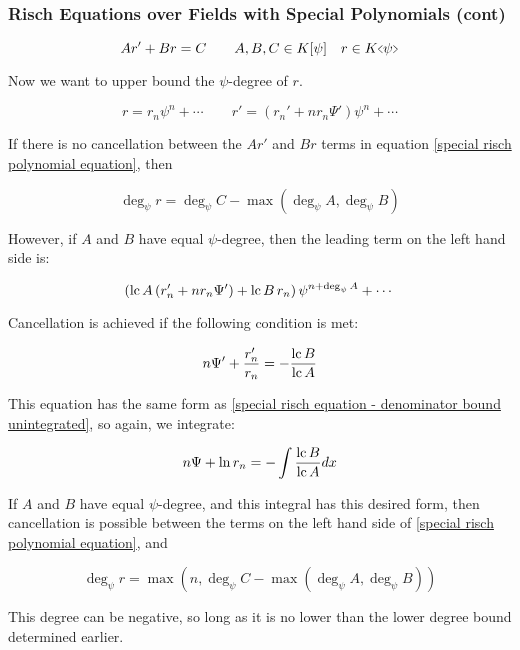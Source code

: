 \documentclass[aspectratio=169,dvipsnames]{beamer}
\newcommand{\lc}{{\rm lc\,}}
\begin{document}
\begin{frame}[fragile]
\frametitle{Risch Equations over Fields with Special Polynomials (cont)}
\tiny
\begin{equation}
\label{special risch polynomial equation}
A r' + B r = C \qquad A,B,C \in K[\psi] \quad r \in K\hstretch{0.5}{<}\psi\hstretch{0.5}{>}
\end{equation}

Now we want to upper bound the $\psi$-degree of $r$.

$$r = r_n \psi^n + \cdots \qquad r' = (r_n' + n r_n \Psi') \psi^n + \cdots$$

If there is no cancellation between the $Ar'$ and $Br$ terms in equation \ref{special risch polynomial equation}, then

$$\deg_\psi r = \deg_\psi C - \max(\deg_\psi A, \deg_\psi B)$$

However, if $A$ and $B$ have equal $\psi$-degree, then the leading term on the left hand side is:

$$\left(\lc A\, (r_n' + n r_n \Psi') + \lc B\, r_n\right)\psi^{n+\deg_\psi A} + \cdots$$

Cancellation is achieved if the following condition is met:

\begin{equation}
\label{special risch equation - numerator bound unintegrated}
n \Psi' + \frac{r_n'}{r_n} = - \frac{\lc B}{\lc A}
\end{equation}

This equation has the same form as \ref{special risch equation - denominator bound unintegrated}, so again, we integrate:

\begin{equation}
\label{special risch equation - numerator bound}
n \Psi + \ln r_n = - \int \frac{\lc B}{\lc A} dx
\end{equation}

If $A$ and $B$ have equal $\psi$-degree, and this integral has this desired form, then cancellation
is possible between the terms on the left hand side of
\ref{special risch polynomial equation}, and

$$\deg_\psi r = \max(n, \deg_\psi C - \max(\deg_\psi A, \deg_\psi B))$$



This degree can be negative, so long as it is no lower than
the lower degree bound determined earlier.
\end{frame}
\end{document}
